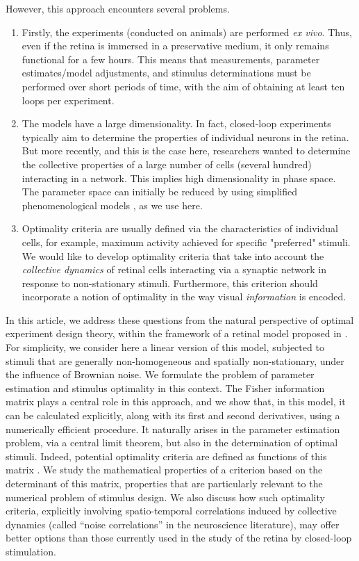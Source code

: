 \documentclass[a4paper]{article}
\theoremstyle{definition}
\theoremstyle{remark}
\begin{document}
However, this approach encounters several problems. 
\begin{enumerate}
    \item Firstly, the experiments (conducted on animals) are performed \textit{ex vivo}. Thus, even if the retina is immersed in a preservative medium, it only remains functional for a few hours. This means that measurements, parameter estimates/model adjustments, and stimulus determinations must be performed over short periods of time, with the aim of obtaining at least ten loops per experiment. 
    \item The models have a large dimensionality. In fact, closed-loop experiments typically aim to determine the properties of individual neurons in the retina. But more recently, and this is the case here, researchers wanted to determine the collective properties of a large number of cells (several hundred) interacting in a network. This implies high dimensionality in phase space. The parameter space can initially be reduced by using simplified phenomenological models \cite{kartsaki-hilgen-etal:24}, as we use here.
    \item Optimality criteria are usually defined via the characteristics of individual cells, for example, maximum activity achieved for specific "preferred" stimuli. We would like to develop optimality criteria that take into account the \textit{collective dynamics} of retinal cells interacting via a synaptic network in response to non-stationary stimuli. Furthermore, this criterion should incorporate a notion of optimality in the way visual \textit{information} is encoded. 
\end{enumerate}

In this article, we address these questions from the natural perspective of optimal experiment design theory, within the framework of a retinal model proposed in \cite{kartsaki-hilgen-etal:24}. For simplicity, we consider here a linear version of this model, subjected to stimuli that are generally non-homogeneous and spatially non-stationary, under the influence of Brownian noise. We formulate the problem of parameter estimation and stimulus optimality in this context. The Fisher information matrix plays a central role in this approach, and we show that, in this model, it can be calculated explicitly, along with its first and second derivatives, using a numerically efficient procedure. It naturally arises in the parameter estimation problem, via a central limit theorem, but also in the determination of optimal stimuli. Indeed, potential optimality criteria are defined as functions of this matrix \cite{}. We study the mathematical properties of a criterion based on the determinant of this matrix, properties that are particularly relevant to the numerical problem of stimulus design. We also discuss how such optimality criteria, explicitly involving spatio-temporal correlations induced by collective dynamics (called “noise correlations” in the neuroscience literature), may offer better options than those currently used in the study of the retina by closed-loop stimulation.
\end{document}
